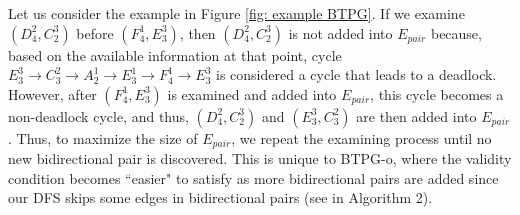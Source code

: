 \documentclass[letterpaper]{article} %
\theoremstyle{definition}
\newcommand{\rishi}[1]{\textcolor{black}{\textbf{Rishi:}}
\textcolor{purple}{#1}}
\begin{document}

%          
%          



Let us consider the example in Figure \ref{fig: example BTPG}.
If we examine $(D^2_4,C^3_2)$ before $(F^1_4,E^3_3)$, then $(D^2_4,C^3_2)$ is not added into $E_{pair}$ because, based on the available information at that point, cycle $E^3_3 \rightarrow C^2_3 \rightarrow A^1_2  \rightarrow E^1_3 \rightarrow F^1_4 \rightarrow E^3_3$ is considered a cycle that leads to a deadlock. However, after $(F^1_4, E^3_3)$ is examined and added into $E_{pair}$, this cycle becomes a non-deadlock cycle, and thus, $(D^2_4,C^3_2)$ and $(E^3_3,C^2_3)$ are then added into $E_{pair}$.
Thus, to maximize the size of $E_{pair}$, we repeat the examining process until no new bidirectional pair is discovered. This is unique to BTPG-o, where the validity condition becomes ``easier" to satisfy as more bidirectional pairs are added since our DFS skips some edges in bidirectional pairs (see  in Algorithm 2). %
\end{document}
